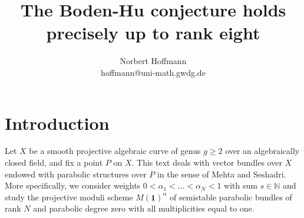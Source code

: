 \documentclass{article}
\begin{document}
\theoremstyle{definition}
 \newtheorem{defn}{Definition}[section]
\theoremstyle{plain}
 \newtheorem{thm}[defn]{Theorem}
 \newtheorem{lemma}[defn]{Lemma}
 \newtheorem{prop}[defn]{Proposition}
 \newtheorem{cor}[defn]{Corollary}
 \newtheorem{conj}[defn]{Conjecture}
\theoremstyle{remark}
 \newtheorem{example}[defn]{Example}
 \newtheorem{rem}[defn]{Remark}

\renewcommand{\O}{\mathcal{O}}
\renewcommand{\L}{\mathcal{L}}
\newcommand{\T}{\mathcal{T}}
\newcommand{\E}{\mathcal{E}}
\newcommand{\F}{\mathcal{F}}
\newcommand{\Gm}{\mathbb{G}_m}
\newcommand{\I}{\mathrm{I}}
\newcommand{\one}{\underline{\mathbf{1}}}
\newcommand{\Hom}{\mathrm{Hom}}
\newcommand{\End}{\mathrm{End}}
\newcommand{\Aut}{\mathrm{Aut}}
\newcommand{\Homsheaf}{\mathcal{H}om}
\newcommand{\Ext}{\mathrm{Ext}}
\newcommand{\Spec}{\mathrm{Spec}\:}
\newcommand{\Sym}{\mathrm{Sym}\:}
\newcommand{\sign}{\mathrm{sgn}}
\newcommand{\triv}{\mathrm{triv}}
\newcommand{\univ}{\mathrm{univ}}
\newcommand{\stab}{\mathrm{stab}}
\newcommand{\dev}{\mathrm{dev}}
\newcommand{\med}{\mathrm{med}}
\newcommand{\low}{\mathrm{low}}
\newcommand{\middle}{\mathrm{mid}}
\newcommand{\high}{\mathrm{high}}
\newcommand{\dual}{\mathrm{dual}}
\newcommand{\id}{\mathrm{id}}
\newcommand{\ex}{\mathrm{ex}}
\newcommand{\cl}{\mathrm{cl}}
\newcommand{\codim}{\mathrm{codim}}
\newcommand{\intW}[1]{W(#1)^{\circ}}
\newcommand{\rk}{\mathrm{rk}}
\newcommand{\reals}{\mathbb{R}}
\newcommand{\naturals}{\mathbb{N}}
\newcommand{\complexnums}{\mathbb{C}}
\newcommand{\sections}[1]{\Gamma(#1)}
\newcommand{\cohom}{\mathrm{H}}
\newcommand{\chains}{\mathrm{C}}
\newcommand{\eps}{\varepsilon}
\newcommand{\longto}[1][]{\stackrel{#1}{\longrightarrow}}
\newcommand{\otgnol}[1][]{\stackrel{#1}{\longleftarrow}}


\title{The Boden-Hu conjecture holds precisely up to rank eight}
\author{Norbert Hoffmann\\hoffmann@uni-math.gwdg.de}
\date{}
\maketitle

\section*{Introduction}
Let $X$ be a smooth projective algebraic curve of genus $g \geq 2$ over an algebraically closed field, and fix a point $P$ on $X$. This text deals with
vector bundles over $X$ endowed with parabolic structures over $P$ in the sense of Mehta and Seshadri. More specifically, we consider weights
$0 < \alpha_1 < \ldots < \alpha_N < 1$ with sum $s \in \naturals$ and study the projective moduli scheme $M(\one)^{\alpha}$ of semistable parabolic
bundles of rank $N$ and parabolic degree zero with all multiplicities equal to one.
\end{document}
